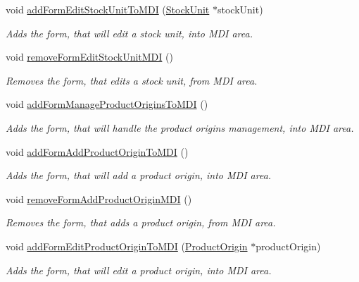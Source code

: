 \begin{DoxyCompactItemize}
void \hyperlink{class_main_window_a25bc22720522f43d55913afd82621c83}{add\-Form\-Edit\-Stock\-Unit\-To\-M\-D\-I} (\hyperlink{class_stock_unit}{\-Stock\-Unit} $\ast$stock\-Unit)
\begin{DoxyCompactList}\small\item\em \-Adds the form, that will edit a stock unit, into \-M\-D\-I area. \end{DoxyCompactList}\item 
void \hyperlink{class_main_window_a86ae6043db2adf28898282cb8abd5483}{remove\-Form\-Edit\-Stock\-Unit\-M\-D\-I} ()
\begin{DoxyCompactList}\small\item\em \-Removes the form, that edits a stock unit, from \-M\-D\-I area. \end{DoxyCompactList}\item 
void \hyperlink{class_main_window_a2459f04a5842643e412db214ccf12310}{add\-Form\-Manage\-Product\-Origins\-To\-M\-D\-I} ()
\begin{DoxyCompactList}\small\item\em \-Adds the form, that will handle the product origins management, into \-M\-D\-I area. \end{DoxyCompactList}\item 
void \hyperlink{class_main_window_a401b61dd50a82f85945fc350f1f5e8b0}{add\-Form\-Add\-Product\-Origin\-To\-M\-D\-I} ()
\begin{DoxyCompactList}\small\item\em \-Adds the form, that will add a product origin, into \-M\-D\-I area. \end{DoxyCompactList}\item 
void \hyperlink{class_main_window_ad5449f3e6b4c18e51304ea3490a46b3c}{remove\-Form\-Add\-Product\-Origin\-M\-D\-I} ()
\begin{DoxyCompactList}\small\item\em \-Removes the form, that adds a product origin, from \-M\-D\-I area. \end{DoxyCompactList}\item 
void \hyperlink{class_main_window_ada0fcce58de3514c2fb0b45172cab0f4}{add\-Form\-Edit\-Product\-Origin\-To\-M\-D\-I} (\hyperlink{class_product_origin}{\-Product\-Origin} $\ast$product\-Origin)
\begin{DoxyCompactList}\small\item\em \-Adds the form, that will edit a product origin, into \-M\-D\-I area. \end{DoxyCompactList}\item 

\end{DoxyCompactItemize}
